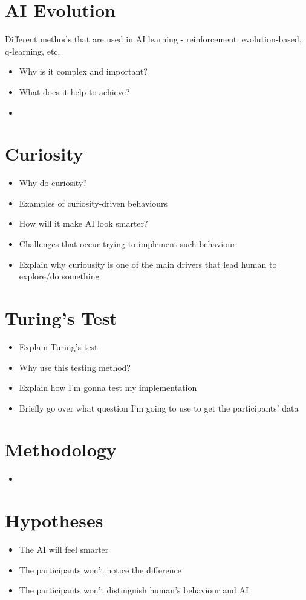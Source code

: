 \documentclass[journal]{IEEEtran}
\begin{document}
\section{AI Evolution}
Different methods that are used in AI learning - reinforcement, evolution-based, q-learning, etc. 
\begin{itemize}
	\item Why is it complex and important?
	\item What does it help to achieve? 
	\item 
\end{itemize}

\section{Curiosity}
\begin{itemize}
	\item Why do curiosity?
	\item Examples of curiosity-driven behaviours
	\item How will it make AI look smarter?
	\item Challenges that occur trying to implement such behaviour
	\item Explain why curiousity is one of the main drivers that lead human to explore/do something
\end{itemize}

\section{Turing's Test}
\begin{itemize}
	\item Explain Turing's test
	\item Why use this testing method?
	\item Explain how I'm gonna test my implementation
	\item Briefly go over what question I'm going to use to get the participants' data
\end{itemize}

\section{Methodology}
\begin{itemize}
	\item 
\end{itemize}

\section{Hypotheses}
\begin{itemize}
	\item The AI will feel smarter
	\item The participants won't notice the difference
	\item The participants won't distinguish human's behaviour and AI
\end{itemize}
\end{document}
